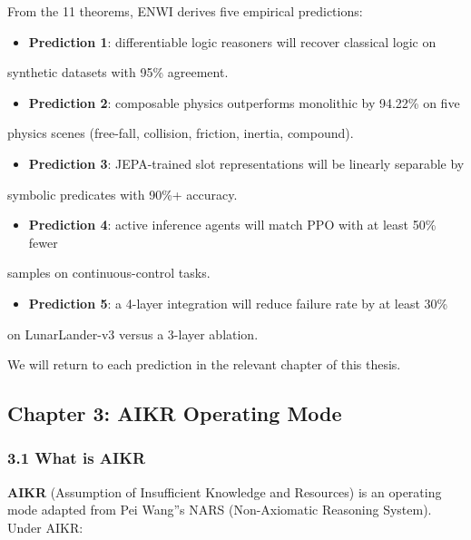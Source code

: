 \documentclass[11pt]{article}
\begin{document}
From the 11 theorems, ENWI derives five empirical predictions:

\begin{itemize}
  \item \textbf{Prediction 1}: differentiable logic reasoners will recover classical logic on
\end{itemize}

  synthetic datasets with 95\% agreement.
\begin{itemize}
  \item \textbf{Prediction 2}: composable physics outperforms monolithic by 94.22\% on five
\end{itemize}

  physics scenes (free-fall, collision, friction, inertia, compound).
\begin{itemize}
  \item \textbf{Prediction 3}: JEPA-trained slot representations will be linearly separable by
\end{itemize}

  symbolic predicates with 90\%+ accuracy.
\begin{itemize}
  \item \textbf{Prediction 4}: active inference agents will match PPO with at least 50\% fewer
\end{itemize}

  samples on continuous-control tasks.
\begin{itemize}
  \item \textbf{Prediction 5}: a 4-layer integration will reduce failure rate by at least 30\%
\end{itemize}

  on LunarLander-v3 versus a 3-layer ablation.

We will return to each prediction in the relevant chapter of this thesis.

\hrulefill

\subsection{Chapter 3: AIKR Operating Mode}

\subsubsection{3.1 What is AIKR}

\textbf{AIKR} (Assumption of Insufficient Knowledge and Resources) is an operating
mode adapted from Pei Wang''s NARS (Non-Axiomatic Reasoning System). Under AIKR:
\end{document}
